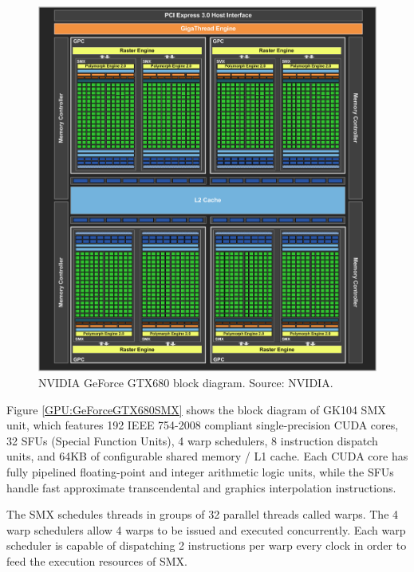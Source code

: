 \begin{figure}
\centering
\includegraphics[width=\textwidth]{GPU/GeForceGTX680BlockDiagram.png}
\caption{NVIDIA GeForce GTX680 block diagram. Source: NVIDIA.}
\label{GPU:GeForceGTX680BlockDiagram}
\end{figure}

Figure \ref{GPU:GeForceGTX680SMX} shows the block diagram of GK104 SMX unit, which features 192 IEEE 754-2008 compliant single-precision CUDA cores, 32 SFUs (Special Function Units), 4 warp schedulers, 8 instruction dispatch units, and 64KB of configurable shared memory / L1 cache. Each CUDA core has fully pipelined floating-point and integer arithmetic logic units, while the SFUs handle fast approximate transcendental and graphics interpolation instructions.

The SMX schedules threads in groups of 32 parallel threads called warps. The 4 warp schedulers allow 4 warps to be issued and executed concurrently. Each warp scheduler is capable of dispatching 2 instructions per warp every clock in order to feed the execution resources of SMX.

